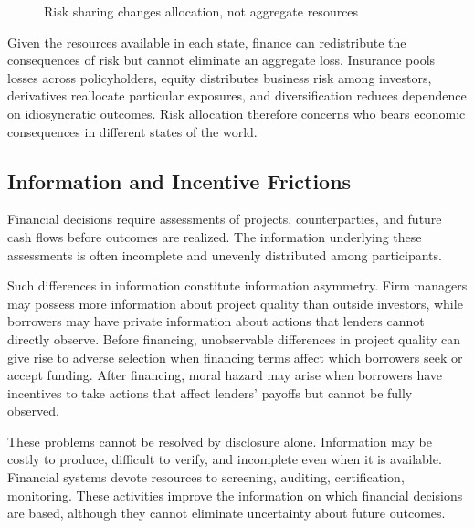 \begin{figure}[H]

\caption{Risk sharing changes allocation, not aggregate resources}
\label{fig:ch1-risk-sharing}
\end{figure}

Given the resources available in each state, finance can redistribute the consequences of risk but cannot eliminate an aggregate loss. Insurance pools losses across policyholders, equity distributes business risk among investors, derivatives reallocate particular exposures, and diversification reduces dependence on idiosyncratic outcomes. Risk allocation therefore concerns who bears economic consequences in different states of the world.

\subsection{Information and Incentive Frictions}

Financial decisions require assessments of projects, counterparties, and future cash flows before outcomes are realized. The information underlying these assessments is often incomplete and unevenly distributed among participants.

Such differences in information constitute information asymmetry. Firm managers may possess more information about project quality than outside investors, while borrowers may have private information about actions that lenders cannot directly observe. Before financing, unobservable differences in project quality can give rise to adverse selection when financing terms affect which borrowers seek or accept funding. After financing, moral hazard may arise when borrowers have incentives to take actions that affect lenders' payoffs but cannot be fully observed.

These problems cannot be resolved by disclosure alone. Information may be costly to produce, difficult to verify, and incomplete even when it is available. Financial systems devote resources to screening, auditing, certification, monitoring. These activities improve the information on which financial decisions are based, although they cannot eliminate uncertainty about future outcomes.

